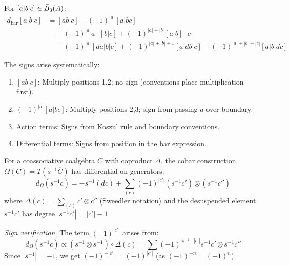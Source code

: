 \begin{computation}
\label{comp:bar-signs-3-2}
For $[a|b|c] \in \bar{B}_3(A)$:
\begin{align*}
d_{\mathrm{bar}}[a|b|c] &= [ab|c] - (-1)^{|a|}[a|bc] \\
&\quad + (-1)^{|a|} a \cdot [b|c] + (-1)^{|a|+|b|} [a|b] \cdot c \\
&\quad + (-1)^{|a|} [da|b|c] + (-1)^{|a|+|b|+1} [a|db|c] + (-1)^{|a|+|b|+|c|} [a|b|dc]
\end{align*}

The signs arise systematically:
\begin{enumerate}[label=(\roman*)]
\item $[ab|c]$: Multiply positions 1,2; no sign (conventions place multiplication first).
\item $(-1)^{|a|}[a|bc]$: Multiply positions 2,3; sign from passing $a$ over boundary.
\item Action terms: Signs from Koszul rule and boundary conventions.
\item Differential terms: Signs from position in the bar expression.
\end{enumerate}
\end{computation}

\begin{computation}
\label{comp:cobar-signs-1-2}
For a coassociative coalgebra $C$ with coproduct $\Delta$, the cobar construction 
$\Omega(C) = T(s^{-1}\overline{C})$ has differential on generators:
\[
d_\Omega(s^{-1}c) = -s^{-1}(dc) + \sum_{(c)} (-1)^{|c'|} (s^{-1}c') \otimes (s^{-1}c'')
\]
where $\Delta(c) = \sum_{(c)} c' \otimes c''$ (Sweedler notation) and the desuspended element $s^{-1}c'$ has degree $|s^{-1}c'| = |c'| - 1$.

\emph{Sign verification.} The term $(-1)^{|c'|}$ arises from:
\[
d_\Omega(s^{-1}c) \propto (s^{-1} \otimes s^{-1}) \circ \Delta(c) = \sum (-1)^{|s^{-1}| \cdot |c'|} s^{-1}c' \otimes s^{-1}c''
\]
Since $|s^{-1}| = -1$, we get $(-1)^{-|c'|} = (-1)^{|c'|}$ (as $(-1)^{-n} = (-1)^n$).
\end{computation}

